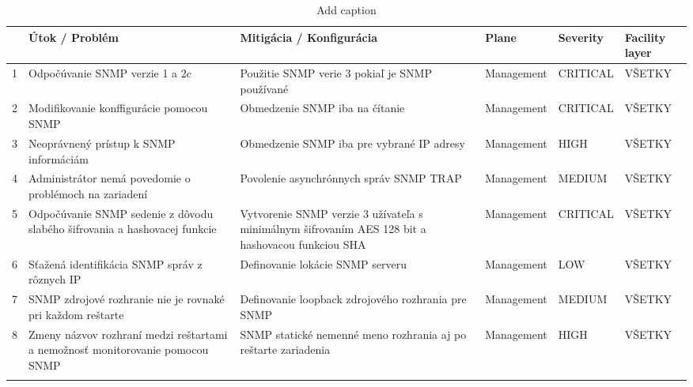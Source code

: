 \begin{longtable}[htbp]{c|p{11.43em}|p{12.215em}|p{7.215em}|p{4.215em}|p{6.57em}}
  \centering
    \hline
    \multicolumn{1}{p{4.215em}|}{Poradové číslo} & Útok / Problém & Mitigácia / Konfigurácia & Plane & Severity\newline{} & Facility layer \bigstrut\\
    \hline
    1 & Odpočúvanie SNMP verzie 1 a 2c & Použitie SNMP verie 3 pokiaľ je SNMP používané & Management & CRITICAL & VŠETKY \bigstrut[t]\\
    \rowcolor[rgb]{ .933,  .933,  .933} 2 & Modifikovanie konffigurácie pomocou SNMP & Obmedzenie SNMP iba na čítanie & Management & CRITICAL & VŠETKY \\
    3 & Neoprávnený prístup k SNMP informáciám & Obmedzenie SNMP iba pre vybrané IP adresy & Management & HIGH & VŠETKY \\
    \rowcolor[rgb]{ .933,  .933,  .933} 4 & Administrátor nemá povedomie o problémoch na zariadení & Povolenie asynchrónnych správ SNMP TRAP & Management & MEDIUM & VŠETKY \\
    5 & Odpočúvanie SNMP sedenie z dôvodu slabého šifrovania a hashovacej  funkcie & Vytvorenie SNMP verzie 3 užívateľa s minimálnym šifrovaním AES 128 bit a hashovacou funkciou SHA & Management & CRITICAL & VŠETKY \\
    \rowcolor[rgb]{ .933,  .933,  .933} 6 & Sťažená identifikácia SNMP správ z rôznych IP & Definovanie lokácie SNMP serveru & Management & LOW & VŠETKY \\
    7 & SNMP zdrojové rozhranie nie je rovnaké pri každom reštarte & Definovanie loopback zdrojového rozhrania pre SNMP & Management & MEDIUM & VŠETKY \\
    \rowcolor[rgb]{ .933,  .933,  .933} 8 & Zmeny názvov rozhraní medzi reštartami a nemožnosť monitorovanie pomocou SNMP & SNMP statické nemenné meno rozhrania aj po reštarte zariadenia & Management & HIGH & VŠETKY \\
    \caption{Add caption}
  \label{tab:addlabel}%
\end{longtable}%
